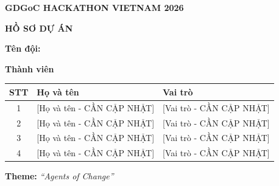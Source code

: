 \documentclass[12pt,a4paper]{article}
\begin{document}

\begin{titlepage}
    \centering

    \vspace*{1cm}
    {\LARGE\textbf{GDGoC HACKATHON VIETNAM 2026}\par}
    \vspace*{0.5cm}
    {\large\textbf{HỒ SƠ DỰ ÁN}\par}
    \vspace{1.5cm}

    \vspace{1.5cm}

    {\Large\textbf{Tên đội:}\par}
    \vspace{0.3cm}
    {\LARGE{}\par}
    \vspace{1.5cm}

    {\Large\textbf{Thành viên}\par}
    \vspace{0.5cm}
    \begin{tabular}{|c|m{5.5cm}|m{4cm}|}
        \hline
        \textbf{STT} & \textbf{Họ và tên} & \textbf{Vai trò} \\
        \hline
        1 & {[Họ và tên - CẦN CẬP NHẬT]} & {[Vai trò - CẦN CẬP NHẬT]} \\
        \hline
        2 & {[Họ và tên - CẦN CẬP NHẬT]} & {[Vai trò - CẦN CẬP NHẬT]} \\
        \hline
        3 & {[Họ và tên - CẦN CẬP NHẬT]} & {[Vai trò - CẦN CẬP NHẬT]} \\
        \hline
        4 & {[Họ và tên - CẦN CẬP NHẬT]} & {[Vai trò - CẦN CẬP NHẬT]} \\
        \hline
    \end{tabular}
    \vspace{2cm}

    {\large\textbf{Theme: } \textit{``Agents of Change''}\par}

    \vfill
\end{titlepage}
\end{document}
